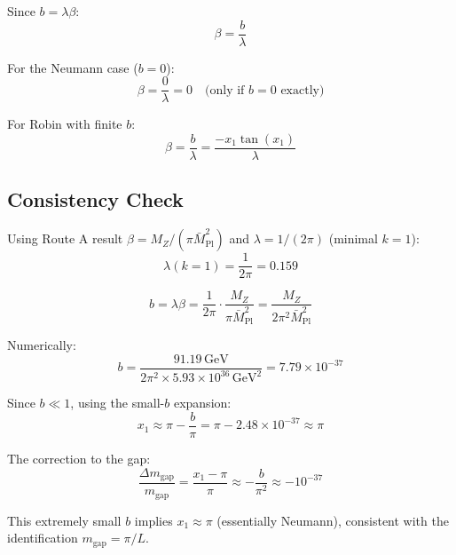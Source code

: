 \documentclass[11pt,a4paper]{article}
\newcommand{\Mpl}{\bar{M}_{\mathrm{Pl}}}
\newcommand{\mgap}{m_{\mathrm{gap}}}
\newcommand{\MZ}{M_Z}
\newcommand{\GeV}{\,\mathrm{GeV}}
\theoremstyle{definition}
\theoremstyle{plain}
\theoremstyle{remark}
\begin{document}
Since $b = \lambda\beta$:
\begin{equation}
\beta = \frac{b}{\lambda}
\label{eq:beta-from-b-lambda}
\end{equation}

For the Neumann case ($b = 0$):
\begin{equation}
\beta = \frac{0}{\lambda} = 0 \quad \text{(only if } b = 0 \text{ exactly)}
\label{eq:beta-neumann}
\end{equation}

For Robin with finite $b$:
\begin{equation}
\beta = \frac{b}{\lambda} = \frac{-x_1\tan(x_1)}{\lambda}
\label{eq:beta-robin}
\end{equation}

\subsection{Consistency Check}

Using Route A result $\beta = \MZ/(\pi\Mpl^2)$ and $\lambda = 1/(2\pi)$ (minimal $k=1$):
\begin{equation}
\lambda(k=1) = \frac{1}{2\pi} = 0.159
\label{eq:lambda-k1}
\end{equation}

\begin{equation}
b = \lambda\beta = \frac{1}{2\pi} \cdot \frac{\MZ}{\pi\Mpl^2} = \frac{\MZ}{2\pi^2\Mpl^2}
\label{eq:b-formula}
\end{equation}

Numerically:
\begin{equation}
b = \frac{91.19\GeV}{2\pi^2 \times 5.93 \times 10^{36}\GeV^2} = 7.79 \times 10^{-37}
\label{eq:b-numeric}
\end{equation}

Since $b \ll 1$, using the small-$b$ expansion:
\begin{equation}
x_1 \approx \pi - \frac{b}{\pi} = \pi - 2.48 \times 10^{-37} \approx \pi
\label{eq:x1-approx}
\end{equation}

The correction to the gap:
\begin{equation}
\frac{\Delta\mgap}{\mgap} = \frac{x_1 - \pi}{\pi} \approx -\frac{b}{\pi^2} \approx -10^{-37}
\label{eq:gap-correction}
\end{equation}

This extremely small $b$ implies $x_1 \approx \pi$ (essentially Neumann), consistent with
the identification $\mgap = \pi/L$.
\end{document}
